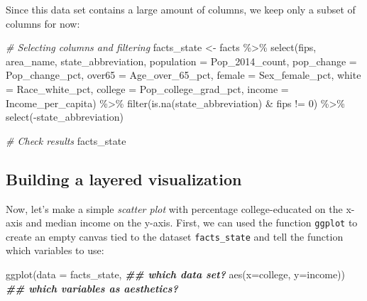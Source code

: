 \documentclass[
]{article}
\newenvironment{Shaded}{\begin{snugshade}}{\end{snugshade}}
\newcommand{\AttributeTok}[1]{\textcolor[rgb]{0.77,0.63,0.00}{#1}}
\newcommand{\CommentTok}[1]{\textcolor[rgb]{0.56,0.35,0.01}{\textit{#1}}}
\newcommand{\DecValTok}[1]{\textcolor[rgb]{0.00,0.00,0.81}{#1}}
\newcommand{\DocumentationTok}[1]{\textcolor[rgb]{0.56,0.35,0.01}{\textbf{\textit{#1}}}}
\newcommand{\FunctionTok}[1]{\textcolor[rgb]{0.00,0.00,0.00}{#1}}
\newcommand{\NormalTok}[1]{#1}
\newcommand{\OtherTok}[1]{\textcolor[rgb]{0.56,0.35,0.01}{#1}}
\newcommand{\SpecialCharTok}[1]{\textcolor[rgb]{0.00,0.00,0.00}{#1}}
\begin{document}
Since this data set contains a large amount of columns, we keep only a
subset of columns for now:

\begin{Shaded}
\begin{Highlighting}[]
\CommentTok{\# Selecting columns and filtering }
\NormalTok{facts\_state }\OtherTok{\textless{}{-}}\NormalTok{ facts }\SpecialCharTok{\%\textgreater{}\%} 
  \FunctionTok{select}\NormalTok{(fips, area\_name, state\_abbreviation, }
         \AttributeTok{population =}\NormalTok{ Pop\_2014\_count, }
         \AttributeTok{pop\_change =}\NormalTok{ Pop\_change\_pct,}
         \AttributeTok{over65 =}\NormalTok{ Age\_over\_65\_pct, }
         \AttributeTok{female =}\NormalTok{ Sex\_female\_pct,}
         \AttributeTok{white =}\NormalTok{ Race\_white\_pct,}
         \AttributeTok{college =}\NormalTok{ Pop\_college\_grad\_pct, }
         \AttributeTok{income =}\NormalTok{ Income\_per\_capita) }\SpecialCharTok{\%\textgreater{}\%}
  \FunctionTok{filter}\NormalTok{(}\FunctionTok{is.na}\NormalTok{(state\_abbreviation) }\SpecialCharTok{\&}\NormalTok{ fips }\SpecialCharTok{!=} \DecValTok{0}\NormalTok{) }\SpecialCharTok{\%\textgreater{}\%} 
  \FunctionTok{select}\NormalTok{(}\SpecialCharTok{{-}}\NormalTok{state\_abbreviation)}

\CommentTok{\# Check results}
\NormalTok{facts\_state}
\end{Highlighting}
\end{Shaded}

\hypertarget{building-a-layered-visualization}{%
\subsection{Building a layered
visualization}\label{building-a-layered-visualization}}

Now, let's make a simple \emph{scatter plot} with percentage
college-educated on the x-axis and median income on the y-axis. First,
we can used the function \texttt{ggplot} to create an empty canvas tied
to the dataset \texttt{facts\_state} and tell the function which
variables to use:

\begin{Shaded}
\begin{Highlighting}[]
\FunctionTok{ggplot}\NormalTok{(}\AttributeTok{data =}\NormalTok{ facts\_state,        }\DocumentationTok{\#\# which data set?}
       \FunctionTok{aes}\NormalTok{(}\AttributeTok{x=}\NormalTok{college, }\AttributeTok{y=}\NormalTok{income))  }\DocumentationTok{\#\# which variables as aesthetics?}
\end{Highlighting}
\end{Shaded}
\end{document}
